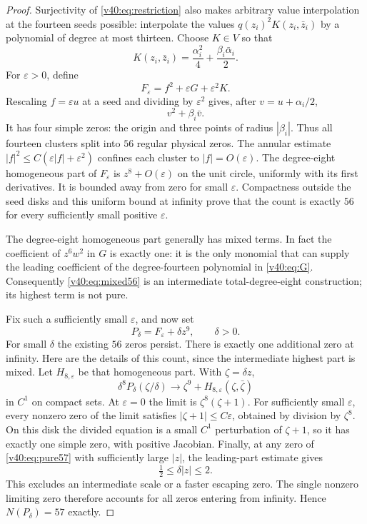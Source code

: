 \documentclass[UTF8,11pt]{ctexart}
\theoremstyle{definition}
\numberwithin{equation}{section}
\begin{document}
\begin{proof}
Surjectivity of \eqref{v40:eq:restriction} also makes arbitrary
value interpolation at the fourteen seeds possible: interpolate
the values $q(z_i)^2K(z_i,\bar z_i)$ by a polynomial of
degree at most thirteen. Choose $K\in V$ so that
\[
 K(z_i,\bar z_i)=\frac{\alpha_i^2}{4}
                         +\frac{\beta_i\bar\alpha_i}{2}.
\]
For $\varepsilon>0$, define
\begin{equation}\label{v40:eq:mixed56}
                     F_\varepsilon=f^2+\varepsilon G+
                                               \varepsilon^2K.
\end{equation}
Rescaling $f=\varepsilon u$ at a seed and dividing by
$\varepsilon^2$ gives, after $v=u+\alpha_i/2$,
\[
                                  v^2+\beta_i\bar v.
\]
It has four simple zeros: the origin and three points of
radius $|\beta_i|$. Thus all fourteen clusters split into
$56$ regular physical zeros. The annular estimate
$|f|^2\le C(\varepsilon|f|+\varepsilon^2)$ confines each
cluster to $|f|=O(\varepsilon)$.
The degree-eight homogeneous part of $F_\varepsilon$ is
$z^8+O(\varepsilon)$ on the unit circle, uniformly with its
first derivatives. It is bounded away from zero for small
$\varepsilon$. Compactness outside the seed disks and this
uniform bound at infinity prove that the count is exactly
$56$ for every sufficiently small positive $\varepsilon$.

The degree-eight homogeneous part generally has mixed terms.
In fact the coefficient of $z^6w^2$ in $G$ is exactly one:
it is the only monomial that can supply the leading coefficient
of the degree-fourteen polynomial in \eqref{v40:eq:G}.
Consequently \eqref{v40:eq:mixed56} is an intermediate
total-degree-eight construction; its highest term is not pure.

Fix such a sufficiently small $\varepsilon$, and now set
\begin{equation}\label{v40:eq:pure57}
                        P_\delta=F_\varepsilon+\delta z^9,
                         \qquad \delta>0.
\end{equation}
For small $\delta$ the existing $56$ zeros persist. There is
exactly one additional zero at infinity. Here are the details
of this count, since the intermediate highest part is mixed.
Let $H_{8,\varepsilon}$ be that homogeneous part. With
$\zeta=\delta z$,
\[
 \delta^8P_\delta(\zeta/\delta)
       \longrightarrow\zeta^9+H_{8,\varepsilon}(\zeta,\bar\zeta)
\]
in $C^1$ on compact sets. At $\varepsilon=0$ the limit is
$\zeta^8(\zeta+1)$. For sufficiently small $\varepsilon$,
every nonzero zero of the limit satisfies
$|\zeta+1|\le C\varepsilon$, obtained by division by
$\zeta^8$. On this disk the divided equation is a small
$C^1$ perturbation of $\zeta+1$, so it has exactly one
simple zero, with positive Jacobian. Finally, at any zero
of \eqref{v40:eq:pure57} with sufficiently large $|z|$,
the leading-part estimate gives
\[
                              \tfrac12\le\delta|z|\le2.
\]
This excludes an intermediate scale or a faster escaping zero.
The single nonzero limiting zero therefore accounts for all
zeros entering from infinity. Hence $N(P_\delta)=57$ exactly.


\end{proof}
\end{document}
